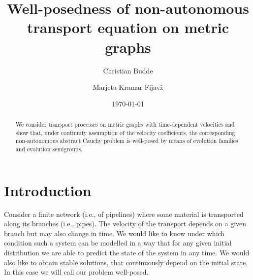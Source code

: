 \documentclass[a4paper,oneside,10pt]{amsart}
\theoremstyle{definition}
\numberwithin{equation}{section}
\begin{document}
\title{Well-posedness of non-autonomous transport equation on metric graphs}

\author{Christian Budde}
\address{University of the Free State, Department of Mathematics and Applied Mathematics, P. O. Box 339, 9300 Bloemfontein, South Africa}

\author{Marjeta Kramar Fijav\v{z}} 
\address{University of Ljubljana, Faculty of Civil and Geodetic Engineering, Jamova 2, SI-1000 Ljubljana, Slovenia / Institute of Mathematics, Physics, and Mechanics, Jadranska 19, SI-1000 Ljubljana, Slovenia}




\begin{abstract}
We consider transport processes on metric graphs with time-dependent velocities and show that, under  continuity assumption of the velocity coefficients,  the corresponding non-autonomous abstract Cauchy problem is well-posed  by means of evolution families and evolution semigroups.  
\end{abstract}

\date{\today}
\maketitle

\section{Introduction}

Consider a finite network (i.e., of pipelines)  where  some material is transported along its branches (i.e., pipes). The velocity of the transport  depends on a given branch but may also change in time. We would like to know under which condition such a system can be modelled in a way that for any given initial distribution we are able to predict the state of the system in any time. We would also like to obtain stable solutions, that continuously depend on the initial state. In this case we will call our problem well-posed.
\end{document}
